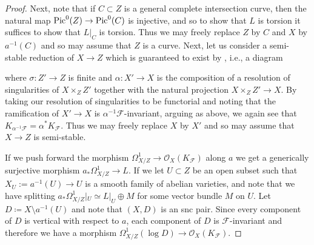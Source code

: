 \documentclass[12pt]{amsart}
\newcommand{\cal}[1]{\mathcal{#1}}
\begin{document}
\begin{proof}
Next, note that if $C \subset Z$ is a general complete intersection curve, then the natural map ${\rm Pic}^0(Z) \to {\rm Pic}^0(C)$ is injective, and so to show that $L$ is torsion it suffices to show that $L\vert_C$ is torsion.
Thus we may freely replace $Z$ by $C$ and $X$ by $a^{-1}(C)$ and so may assume that $Z$ is a curve.
Next, let us consider a semi-stable reduction of $X \to Z$ which is guaranteed to exist by \cite{kkms73}, i.e., a diagram

\begin{center}
\end{center}
where $\sigma\colon Z' \to Z$ is finite and $\alpha\colon X' \to X$ is the composition of a resolution of singularities of $X\times_ZZ'$ together with the natural projection $X\times_ZZ' \to X$.
By taking our resolution of singularities to be functorial and noting that the ramification of $X' \to X$ 
is $\alpha^{-1}\mathcal F$-invariant, arguing as above, we again see that $K_{\alpha^{-1}\mathcal F} = \alpha^*K_{\mathcal F}$.  Thus we may freely replace $X$ by $X'$ and so may assume that $X \to Z$ is semi-stable.

If we push forward the morphism $\Omega^1_{X/Z} \to \mathcal O_X(K_{\mathcal F})$ along $a$
we get a generically surjective morphism $a_*\Omega^1_{X/Z} \to L$.
If we let $U \subset Z$ be an open subset such that $X_U:=a^{-1}(U) \to U$ is a smooth family of abelian varieties, and note that we have splitting $a_*\Omega^1_{X/Z}|_U \simeq L|_U \oplus M$ for some vector bundle $M$ on $U$. 
Let $D \coloneq X \setminus a^{-1}(U)$ and note that $(X, D)$ is an snc pair.
Since every component of $D$ is vertical with respect to $a$, each component of $D$ is $\cal F$-invariant and therefore we  have a morphism $\Omega^1_{X/Z}(\log D) \to \cal O_X(K_{\mathcal F})$.



\end{proof}
\end{document}
